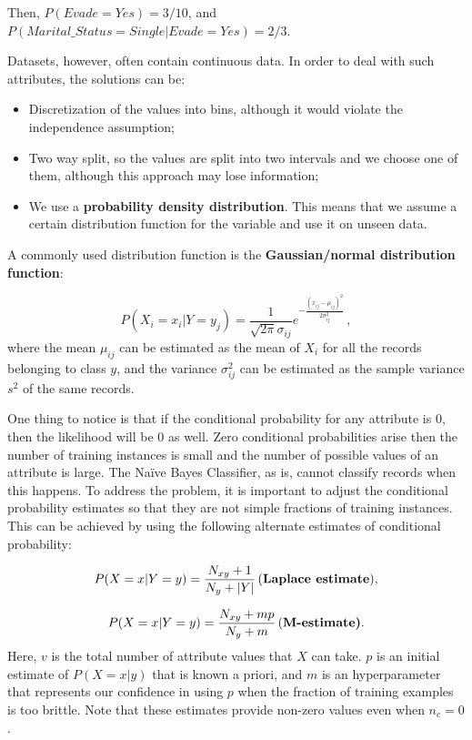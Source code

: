 Then, $P(Evade = Yes) = 3/10$, and $P(Marital\_Status = Single | Evade = Yes) = 2/3$.

Datasets, however, often contain continuous data. In order to deal with such attributes, the solutions can be:
\begin{itemize}
    \item Discretization of the values into bins, although it would violate the independence assumption;
    \item Two way split, so the values are split into two intervals and we choose one of them, although this approach may lose information;
    \item We use a \textbf{probability density distribution}. This means that we assume a certain distribution function for the variable and use it on unseen data.
\end{itemize}

A commonly used distribution function is the \textbf{Gaussian/normal distribution function}:

\begin{equation*}
    P(X_i = x_i | Y = y_j) = \dfrac{1}{\sqrt{2 \pi} \sigma_{ij}} e^{-\frac{(x_{ij} - \mu_{ij})^2}{2 \sigma_{ij}^2}} \, ,
\end{equation*}
where the mean $\mu_{ij}$ can be estimated as the mean of $X_i$ for all the records belonging to class $y$, and the variance $\sigma_{ij}^2$ can be estimated as the sample variance $s^2$ of the same records.

One thing to notice is that if the conditional probability for any attribute is 0, then the likelihood will be 0 as well. Zero conditional probabilities arise then the number of training instances is small and the number of possible values of an attribute is large. The Naïve Bayes Classifier, as is, cannot classify records when this happens. To address the problem, it is important to adjust the conditional probability estimates so that they are not simple fractions of training instances. This can be achieved by using the following alternate estimates of conditional probability:

\begin{equation*}
    P(X = x| Y = y) = \dfrac{N_{xy} + 1}{N_y + |Y|} \, \text{(\textbf{Laplace estimate})},
\end{equation*}

\begin{equation*}
    P(X = x| Y = y) = \dfrac{N_{xy} + mp}{N_y + m} \, \text{(\textbf{M-estimate)}}.
\end{equation*}
Here, $v$ is the total number of attribute values that $X$ can take. $p$ is an initial estimate of $P(X = x | y)$ that is known a priori, and $m$ is an hyperparameter that represents our confidence in using $p$ when the fraction of training examples is too brittle. Note that these estimates provide non-zero values even when $n_c = 0$.

